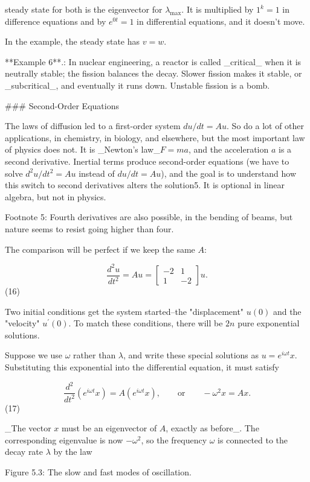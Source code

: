 steady state for both is the eigenvector for \(\lambda_{\max}\). It is multiplied by \(1^{k}=1\) in difference equations and by \(e^{0t}=1\) in differential equations, and it doesn't move.

In the example, the steady state has \(v=w\).

**Example 6**.: In nuclear engineering, a reactor is called _critical_ when it is neutrally stable; the fission balances the decay. Slower fission makes it stable, or _subcritical_, and eventually it runs down. Unstable fission is a bomb.

### Second-Order Equations

The laws of diffusion led to a first-order system \(du/dt=Au\). So do a lot of other applications, in chemistry, in biology, and elsewhere, but the most important law of physics does not. It is _Newton's law_\(F=ma\), and the acceleration \(a\) is a second derivative. Inertial terms produce second-order equations (we have to solve \(d^{2}u/dt^{2}=Au\) instead of \(du/dt=Au\)), and the goal is to understand how this switch to second derivatives alters the solution5. It is optional in linear algebra, but not in physics.

Footnote 5: Fourth derivatives are also possible, in the bending of beams, but nature seems to resist going higher than four.

The comparison will be perfect if we keep the same \(A\):

\[\frac{d^{2}u}{dt^{2}}=Au=\begin{bmatrix}-2&1\\ 1&-2\end{bmatrix}u.\] (16)

Two initial conditions get the system started--the "displacement" \(u(0)\) and the "velocity" \(u^{\prime}(0)\). To match these conditions, there will be \(2n\) pure exponential solutions.

Suppose we use \(\omega\) rather than \(\lambda\), and write these special solutions as \(u=e^{i\omega t}x\). Substituting this exponential into the differential equation, it must satisfy

\[\frac{d^{2}}{dt^{2}}(e^{i\omega t}x)=A(e^{i\omega t}x),\qquad\text{or}\qquad- \omega^{2}x=Ax.\] (17)

_The vector \(x\) must be an eigenvector of \(A\), exactly as before_. The corresponding eigenvalue is now \(-\omega^{2}\), so the frequency \(\omega\) is connected to the decay rate \(\lambda\) by the law

Figure 5.3: The slow and fast modes of oscillation.

 